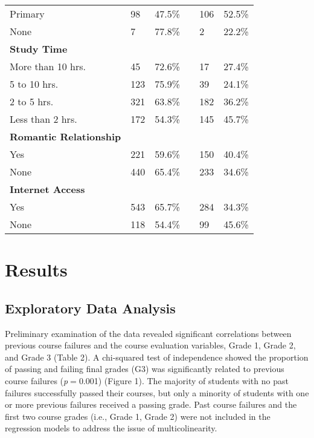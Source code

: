 \documentclass[sigconf]{acmart}
\begin{document}
\begin{table}
\begin{tabular}{llllll}
    Primary         &  98 & 47.5\% & & 106 & 52.5\% \\
    None            &   7 & 77.8\% & &   2 & 22.2\% \\
    \midrule    
    \textbf{Study Time} &   &  &  &  &     \\
    More than 10 hrs. &  45 & 72.6\% & &  17 & 27.4\% \\
    5 to 10 hrs.      & 123 & 75.9\% & &  39 & 24.1\% \\
    2 to 5 hrs.       & 321 & 63.8\% & & 182 & 36.2\% \\    
    Less than 2 hrs.  & 172 & 54.3\% & & 145 & 45.7\% \\
    \midrule
    \textbf{Romantic Relationship} & &  &  &  & \\
    Yes             & 221 & 59.6\% & & 150 & 40.4\%  \\    
    None            & 440 & 65.4\% & & 233 & 34.6\%  \\
    \midrule
    \textbf{Internet Access} & &  &  &  & \\
    Yes             & 543 & 65.7\% & & 284 & 34.3\%  \\    
    None            & 118 & 54.4\% & &  99 & 45.6\%  \\
    \bottomrule
  \end{tabular}
\end{table}

 
\section{Results}

\subsection{Exploratory Data Analysis}

Preliminary examination of the data revealed significant correlations 
between previous course failures and the course evaluation variables,
Grade 1, Grade 2, and Grade 3 (Table 2). A chi-squared test of independence 
showed the proportion of passing and failing final grades (G3) was 
significantly related to previous course failures (\textit{p}$=$0.001)
(Figure 1). The majority of students with no past failures successfully 
passed their courses, but only a minority of students with one or more 
previous failures received a passing grade. Past course failures and 
the first two course grades (i.e., Grade 1, Grade 2) were not included 
in the regression models to address the issue of multicolinearity.
\end{document}
